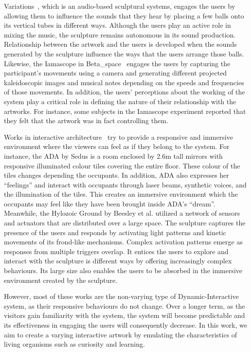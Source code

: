 Variations~\cite{Wands2005}, which is an audio-based sculptural systems, engages the users by allowing them to influence the sounds that they hear by placing a few balls onto its vertical tubes in different ways. Although the users play an active role in mixing the music, the sculpture remains autonomous in its sound production. Relationship between the artwork and the users is developed when the sounds generated by the sculpture influence the ways that the users arrange those balls. 
Likewise, the Iamascope in Beta\_space~\cite{Costello2005} engages the users by capturing the participant's movements using a camera and generating different projected kaleidoscopic images and musical notes depending on the speeds and frequencies of those movements. In addition, the users' perceptions about the working of the system play a critical role in defining the nature of their relationship with the artworks. For instance, some subjects in the Iamascope experiment reported that they felt that the artwork was in fact controlling them. 

Works in interactive architecture~\cite{Hangar.org} try to provide a responsive and immersive environment where the viewers can feel as if they belong to the system. For instance, the ADA by Sedus is a room enclosed by 2.6m tall mirrors with responsive illuminated colour tiles covering the entire floor. These colour of the tiles changes depending the occupants. In addition, ADA also expresses her ``feelings'' and interact with occupants through laser beams, synthetic voices, and the illumination of the tiles. This creates an immersive environment which the occupants may feel like they have been brought inside ADA's ``dream''. 
Meanwhile, the Hylozoic Ground by Beesley et al. \cite{Beesley2010} utilized a network of sensors and actuators that are distributed over a large space. The sculpture captures the presence of the users and responds by activating light patterns and kinetic movements of its frond-like mechanisms. Complex activation patterns emerge as responses from multiple triggers overlap. It entices the users to explore and interact with the sculpture is different ways by offering increasingly complex behaviours. Its large size also enables the users to be absorbed in the immersive environment created by the sculpture. 

However, most of these works are the non-varying type of Dynamic-Interactive system, as their responsive behaviours do not change. Over a longer term, as the visitors gain familiarity with the system, the system will become predictable and its effectiveness in engaging the users will consequently decrease. In this work, we aim to create a varying interactive artwork by emulating the characteristics of living organisms such as curiosity and learning. 


